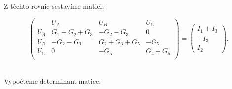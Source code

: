 \documentclass[10pt,a4paper]{article}
\begin{document}
\begin{large}
    \begin{flushleft}
     Z těchto rovnic sestavíme matici:
    \end{flushleft}
    \end{large}  
  
 \begin{center}
   \begin{large}
\[\left( 
  \begin{array}{cccc}
   \ & U_A & U_B & U_C \\
   U_A & G_1 + G_2 + G_3 & -G_2 -G_3 & 0 \\
   U_B & -G_2 - G_3 & G_2 + G_3 + G_5 & -G_5 \\
   U_C & 0 & -G_5 &G_4 +G_5 \\
  \end{array}  \right)= \begin{pmatrix} I_1 +I_3 \\ -I_3 \\ I_2 \end{pmatrix}
  .\]
  \\[20pt]         
   \end{large}
  \end{center}    
  \newpage
  
\begin{large}
    \begin{flushleft}
     Vypočteme determinant matice:
    \end{flushleft}
    \end{large}    
  
\end{document}
